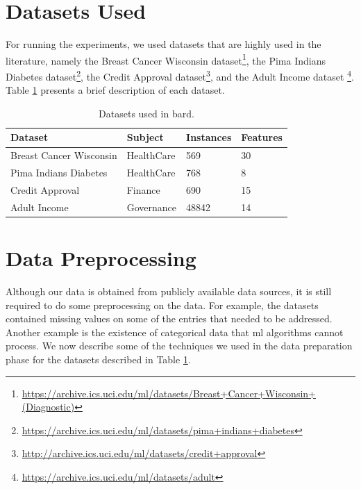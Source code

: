 



\section{Datasets Used}
\label{sec:DatasetsImplementation}

For running the experiments, we used datasets that are highly used in the literature, namely the Breast Cancer Wisconsin dataset\footnote{\url{https://archive.ics.uci.edu/ml/datasets/Breast+Cancer+Wisconsin+(Diagnostic)}}, the Pima Indians Diabetes dataset\footnote{\url{https://archive.ics.uci.edu/ml/datasets/pima+indians+diabetes}}, the Credit Approval dataset\footnote{\url{http://archive.ics.uci.edu/ml/datasets/credit+approval}}, and the Adult Income dataset \footnote{\url{https://archive.ics.uci.edu/ml/datasets/adult}}. Table \ref{table:datasets} presents a brief description of each dataset.


\begin{table}[H]
\centering
\caption{Datasets used in \ac{bard}.}
\label{table:datasets}
\begin{tabular}{|l|l|l|l|}
\hline
\textbf{Dataset} & \textbf{Subject} & \textbf{Instances} & \textbf{Features} \\ \hline
 Breast Cancer Wisconsin  &  HealthCare  & 569    & 30       \\ \hline
 Pima Indians Diabetes    &  HealthCare  & 768    &  8       \\ \hline
 Credit Approval          &  Finance     & 690    & 15       \\ \hline
 Adult Income             &  Governance  & 48842  & 14       \\ \hline 
\end{tabular}
\end{table}



\section{Data Preprocessing}
\label{sec:DataPreProcessingImplementation}

Although our data is obtained from publicly available data sources, it is still required to do some preprocessing on the data.
For example, the datasets contained missing values on some of the entries that needed to be addressed. Another example is the existence of categorical data that \ac{ml} algorithms cannot process. We now describe some of the techniques we used in the data preparation phase for the datasets described in Table \ref{table:datasets}.


